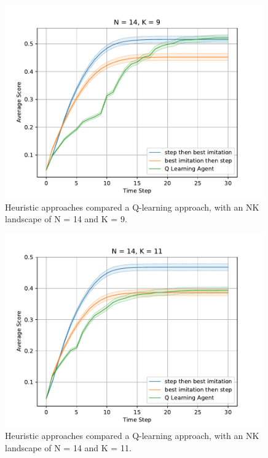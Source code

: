 \documentclass[a4paper]{article}
\begin{document}
\begin{figure}
\centering
\includegraphics[width=30em]{../figures/comp9.pdf}
\caption{
    Heuristic approaches compared a Q-learning approach,
    with an NK landscape of N = 14 and K = 9.
}
\label{comp9}
\end{figure}

\begin{figure}
\centering
\includegraphics[width=30em]{../figures/comp11.pdf}
\caption{
    Heuristic approaches compared a Q-learning approach,
    with an NK landscape of N = 14 and K = 11.
}
\label{comp11}
\end{figure}
\end{document}
